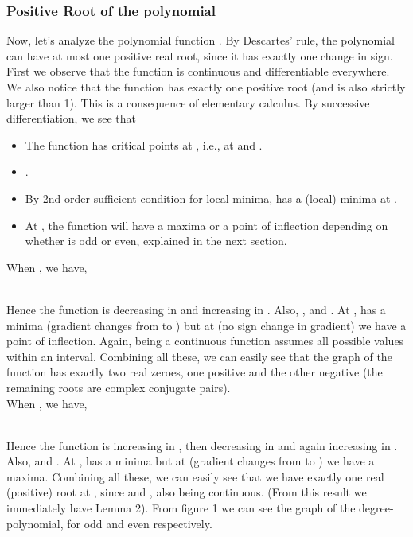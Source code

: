 \documentclass{ijcsa}
\begin{document}
\subsubsection*{Positive Root of the polynomial }
Now, let's analyze the polynomial function . By Descartes' rule, the polynomial
can have at most one positive real root, since it has exactly one change in sign. \\

First we observe that the function  is continuous and differentiable everywhere. We also notice that the function has exactly one positive root  (and  is also strictly larger than 1). This is a consequence of elementary calculus. 
By successive differentiation, we see that 



\par 
\begin{itemize}
	\item The function  has critical points at , i.e., at  and .
	\item .
	\item By 2nd order sufficient condition for local minima,  has a (local) minima at .
	\item At , the function will have a maxima or a point of inflection depending on whether  is odd or even,
				explained in the next section.
\end{itemize}

When , we have,
		\par  \\
		
Hence the function is decreasing in  and increasing in .	Also, ,    and . At ,  has a minima (gradient changes from  to ) but at  (no sign change in gradient) we 
have a point of inflection. Again,  being a continuous function assumes all possible values within an interval. 
Combining all these, we can easily see that the graph of the function has exactly two real zeroes, 
one positive and the other negative (the remaining roots are complex conjugate pairs). \\

When , we have,
	\par  \\
		
		Hence the function is increasing in , then decreasing in  and again 
		increasing in .	Also,   and . At ,  has a minima but at  (gradient changes from  to ) we 
		have a maxima. Combining all these, we can easily see that we have exactly one real (positive) root at , since
		 and , also  being continuous. (From this result we immediately have Lemma 2). From figure 1		
		we can see the graph of the degree- polynomial, for odd and even  respectively.
\end{document}
